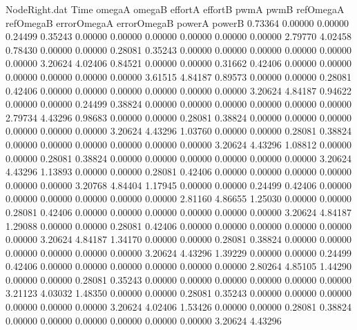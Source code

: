 \begin{filecontents}{NodeRight.dat}
Time omegaA omegaB effortA effortB pwmA pwmB refOmegaA refOmegaB errorOmegaA errorOmegaB powerA powerB
   0.73364    0.00000    0.00000     0.24499    0.35243    0.00000    0.00000    0.00000    0.00000    0.00000    0.00000    2.79770    4.02458
   0.78430    0.00000    0.00000     0.28081    0.35243    0.00000    0.00000    0.00000    0.00000    0.00000    0.00000    3.20624    4.02406
   0.84521    0.00000    0.00000     0.31662    0.42406    0.00000    0.00000    0.00000    0.00000    0.00000    0.00000    3.61515    4.84187
   0.89573    0.00000    0.00000     0.28081    0.42406    0.00000    0.00000    0.00000    0.00000    0.00000    0.00000    3.20624    4.84187
   0.94622    0.00000    0.00000     0.24499    0.38824    0.00000    0.00000    0.00000    0.00000    0.00000    0.00000    2.79734    4.43296
   0.98683    0.00000    0.00000     0.28081    0.38824    0.00000    0.00000    0.00000    0.00000    0.00000    0.00000    3.20624    4.43296
   1.03760    0.00000    0.00000     0.28081    0.38824    0.00000    0.00000    0.00000    0.00000    0.00000    0.00000    3.20624    4.43296
   1.08812    0.00000    0.00000     0.28081    0.38824    0.00000    0.00000    0.00000    0.00000    0.00000    0.00000    3.20624    4.43296
   1.13893    0.00000    0.00000     0.28081    0.42406    0.00000    0.00000    0.00000    0.00000    0.00000    0.00000    3.20768    4.84404
   1.17945    0.00000    0.00000     0.24499    0.42406    0.00000    0.00000    0.00000    0.00000    0.00000    0.00000    2.81160    4.86655
   1.25030    0.00000    0.00000     0.28081    0.42406    0.00000    0.00000    0.00000    0.00000    0.00000    0.00000    3.20624    4.84187
   1.29088    0.00000    0.00000     0.28081    0.42406    0.00000    0.00000    0.00000    0.00000    0.00000    0.00000    3.20624    4.84187
   1.34170    0.00000    0.00000     0.28081    0.38824    0.00000    0.00000    0.00000    0.00000    0.00000    0.00000    3.20624    4.43296
   1.39229    0.00000    0.00000     0.24499    0.42406    0.00000    0.00000    0.00000    0.00000    0.00000    0.00000    2.80264    4.85105
   1.44290    0.00000    0.00000     0.28081    0.35243    0.00000    0.00000    0.00000    0.00000    0.00000    0.00000    3.21123    4.03032
   1.48350    0.00000    0.00000     0.28081    0.35243    0.00000    0.00000    0.00000    0.00000    0.00000    0.00000    3.20624    4.02406
   1.53426    0.00000    0.00000     0.28081    0.38824    0.00000    0.00000    0.00000    0.00000    0.00000    0.00000    3.20624    4.43296

\end{filecontents}
